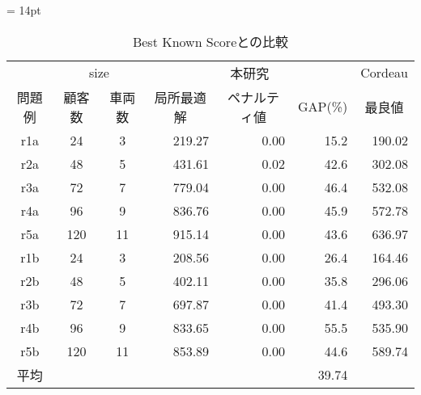 \begin{table}[]
\tabcolsep = 14pt
\renewcommand{\arraystretch}{0.8}
\caption{Best Known Scoreとの比較}
\label{cordeau}
\begin{tabular}{cccrrrr}
\hline
\multicolumn{1}{l}{} & \multicolumn{2}{c}{size}                    & \multicolumn{3}{c}{本研究}                                                            & \multicolumn{1}{c}{Cordeau} \\ \cline{2-7}
問題例                  & 顧客数                  & 車両数                  & \multicolumn{1}{c}{局所最適解} & \multicolumn{1}{c}{ペナルティ値} & \multicolumn{1}{c}{GAP(\%)} & \multicolumn{1}{c}{最良値}     \\ \cline{2-7}
r1a                  & 24                   & 3                    & 219.27                  & 0.00                       & 15.2                        & 190.02                      \\
r2a                  & 48                   & 5                    & 431.61                  & 0.02                       & 42.6                        & 302.08                      \\
r3a                  & 72                   & 7                    & 779.04                  & 0.00                       & 46.4                        & 532.08                      \\
r4a                  & 96                   & 9                    & 836.76                  & 0.00                       & 45.9                        & 572.78                      \\
r5a                  & 120                  & 11                   & 915.14                  & 0.00                       & 43.6                        & 636.97                      \\
r1b                  & 24                   & 3                    & 208.56                  & 0.00                       & 26.4                        & 164.46                      \\
r2b                  & 48                   & 5                    & 402.11                  & 0.00                       & 35.8                        & 296.06                      \\
r3b                  & 72                   & 7                    & 697.87                  & 0.00                       & 41.4                        & 493.30                      \\
r4b                  & 96                   & 9                    & 833.65                  & 0.00                       & 55.5                        & 535.90                      \\
r5b                  & 120                  & 11                   & 853.89                  & 0.00                       & 44.6                        & 589.74                      \\ \hline
平均                   & \multicolumn{1}{l}{} & \multicolumn{1}{l}{} & \multicolumn{1}{l}{}    & \multicolumn{1}{l}{}       & 39.74                       & \multicolumn{1}{l}{}        \\ \hline
\end{tabular}
\end{table}

